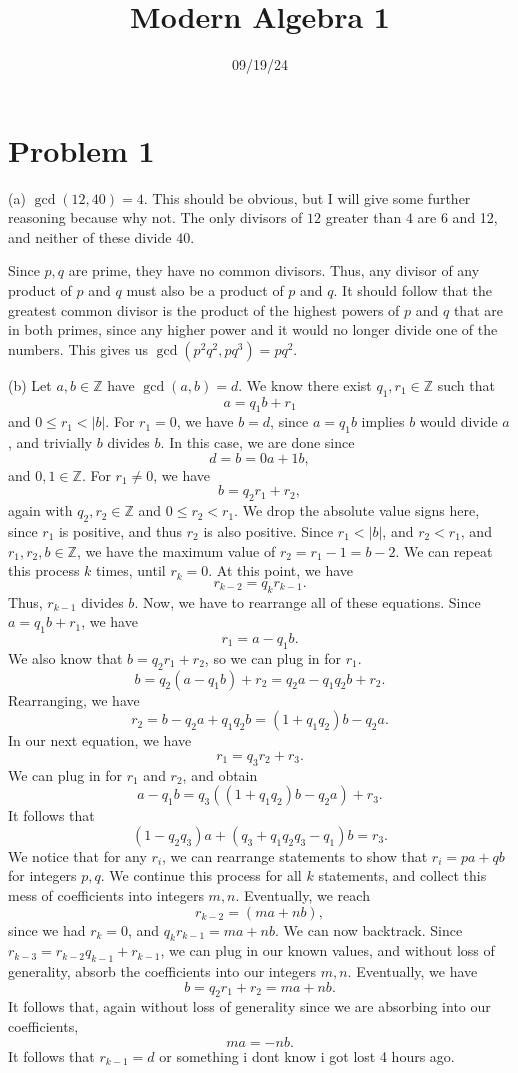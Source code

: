 \documentclass[11pt, letterpaper]{report}
\title{Modern Algebra 1}
\date{09/19/24}
\renewenvironment{solution}[1][]{\begin{setsolution}}{\end{setsolution}}
\begin{document}
 \makeproblem
\section*{Problem 1}
\begin{solution}
	(a) $\operatorname{gcd}(12,40) =4$. This should be obvious, but I will give some further reasoning because why not. The only divisors of $12$ greater than $4$ are 6 and 12, and neither of these divide $40$.

	Since $p,q$ are prime, they have no common divisors. Thus, any divisor of any product of $p$ and $q$ must also be a product of $p$ and $q$. It should follow that the greatest common divisor is the product of the highest powers of $p$ and $q$ that are in both primes, since any higher power and it would no longer divide one of the numbers. This gives us $\operatorname{gcd}(p^2q^2,pq^3) =pq^2$.

	(b) Let $a,b\in\mathbb{Z}$ have $\operatorname{gcd}(a,b) =d$. We know there exist $q_1,r_1\in\mathbb{Z}$ such that
	\[
		a=q_1b+r_1
	\]
	and  $0\leq r_1<\left| b \right| $. For $r_1=0$, we have $b=d$, since $a=q_1b$ implies $b$ would divide $a$, and trivially $b$ divides $b$. In this case, we are done since
	\[
		d=b=0a+1b
	,\]
	and $0,1\in\mathbb{Z}$. For $r_1\neq 0$, we have
	\[
		b = q_2r_1+r_2
	,\]
	again with $q_2,r_2\in\mathbb{Z}$ and $0\leq r_2<r_1$. We drop the absolute value signs here, since $r_1$ is positive, and thus $r_2$ is also positive. Since $r_1<\left| b \right| $, and $r_2<r_1$, and $r_1,r_2,b\in\mathbb{Z}$, we have the maximum value of $r_2 = r_1 - 1 = b - 2$. We can repeat this process $k$ times, until $r_k = 0$. At this point, we have
	\[
		r_{k-2}=q_kr_{k-1}
	.\]
	Thus, $r_{k-1}$ divides $b$. Now, we have to rearrange all of these equations. Since $a=q_1b+r_1$, we have
	\[
		r_1=a-q_1b
	.\]
	We also know that $b=q_2r_1 + r_2$, so we can plug in for $r_1$.
	\[
		b = q_2 \left( a-q_1b \right) +r_2 = q_2a-q_1q_2b+r_2
	.\]
	Rearranging, we have
	\[
		r_2 = b-q_2a+q_1q_2b = (1+q_1q_2)b-q_2a
	.\]
	In our next equation, we have
	\[
		r_1 = q_3r_2 + r_3
	.\]
	We can plug in for $r_1$ and $r_2$, and obtain
	\[
		a-q_1b = q_3\left( \left( 1+q_1q_2 \right) b-q_2a \right) +r_3
	.\]
	It follows that
	\[
		(1-q_2q_3)a + \left( q_3 + q_1q_2q_3-q_1 \right) b= r_3
	.\]
	We notice that for any $r_i$, we can rearrange statements to show that $r_i = pa+qb$ for integers $p,q$. We continue this process for all $k$ statements, and collect this mess of coefficients into integers $m,n$. Eventually, we reach
	\[
		r_{k-2}=(ma+nb)
	,\]
	since we had $r_k=0$, and $q_kr_{k-1}=ma+nb$. We can now backtrack. Since $r_{k-3}=r_{k-2}q_{k-1}+r_{k-1}$, we can plug in our known values, and without loss of generality, absorb the coefficients into our integers $m,n$. Eventually, we have
\[
	b = q_2r_1 + r_2 = ma+nb
.\]
It follows that, again without loss of generality since we are absorbing into our coefficients,
\[
	ma=-nb
.\]
	It follows that $r_{k-1}=d$ or something i dont know i got lost 4 hours ago.


\end{solution}
\end{document}
